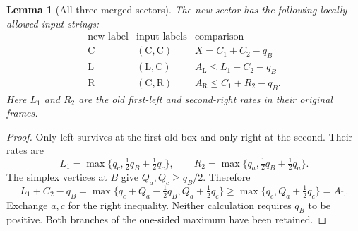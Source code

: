 \documentclass[11pt]{article}
\numberwithin{equation}{section}
\newtheorem{lemma}[theorem]{Lemma}
\theoremstyle{definition}\newtheorem{definition}[theorem]{Definition}
\theoremstyle{remark}\newtheorem{remark}[theorem]{Remark}
\newcommand{\C}{\mathrm C}
\newcommand{\Lft}{\mathrm L}
\newcommand{\Rgt}{\mathrm R}
\begin{document}
\begin{lemma}[All three merged sectors]\label{pc:merge}
The new sector has the following locally allowed input strings:
\begin{equation}\label{pc:merge-table}
\begin{array}{c|c|c}
 \text{new label}&\text{input labels}&\text{comparison}\\ \hline
 \C&(\C,\C)&X=C_1+C_2-q_B\\
 \Lft&(\Lft,\C)&A_\Lft\le L_1+C_2-q_B\\
 \Rgt&(\C,\Rgt)&A_\Rgt\le C_1+R_2-q_B.
\end{array}
\end{equation}
Here \(L_1\) and \(R_2\) are the old first-left and second-right
rates in their original frames.
\end{lemma}
\begin{proof}
Only left survives at the first old box and only right at the
second. Their rates are
\[
 L_1=\max\{q_c,\tfrac12q_B+\tfrac12q_c\},\qquad
 R_2=\max\{q_a,\tfrac12q_B+\tfrac12q_a\}.
\]
The simplex vertices at \(B\) give \(Q_a,Q_c\ge q_B/2\).
Therefore
\[
 L_1+C_2-q_B
 =\max\{q_c+Q_a-\tfrac12q_B,Q_a+\tfrac12q_c\}
 \ge\max\{q_c,Q_a+\tfrac12q_c\}=A_\Lft .
\]
Exchange \(a,c\) for the right inequality. Neither calculation
requires \(q_B\) to be positive. Both branches of the one-sided
maximum have been retained.
\end{proof}
\end{document}
